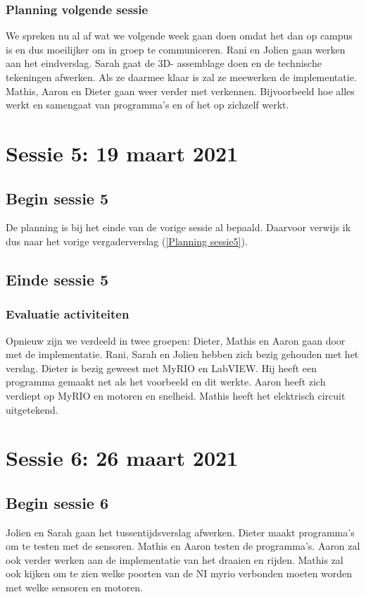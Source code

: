 \documentclass[a4paper,twoside,kulak]{kulakreport} %
\begin{document}
\subsection{Planning volgende sessie}
We spreken nu al af wat we volgende week gaan doen omdat het dan op campus is en dus moeilijker om in groep te communiceren. Rani en Jolien gaan werken aan het eindverslag. Sarah gaat de 3D- assemblage doen en de technische tekeningen afwerken. Als ze daarmee klaar is zal ze meewerken de implementatie. Mathis, Aaron en Dieter gaan weer verder met verkennen. Bijvoorbeeld hoe alles werkt en samengaat van programma's en of het op zichzelf werkt. %
\label{Planning sessie5}

\chapter{Sessie 5: 19 maart 2021}
\section{Begin sessie 5}
De planning is bij het einde van de vorige sessie al bepaald. Daarvoor verwijs ik dus naar het vorige vergaderverslag (\ref{Planning sessie5}).

\section{Einde sessie 5}
\subsection{Evaluatie activiteiten}
Opnieuw zijn we verdeeld in twee groepen: Dieter, Mathis en Aaron gaan door met de implementatie. Rani, Sarah en Jolien hebben zich bezig gehouden met het verslag. Dieter is bezig geweest met MyRIO en LabVIEW. Hij heeft een programma gemaakt net als het voorbeeld en dit werkte. Aaron heeft zich verdiept op MyRIO en motoren en snelheid. Mathis heeft het elektrisch circuit uitgetekend. 

\chapter{Sessie 6: 26 maart 2021}
\section{Begin sessie 6}
Jolien en Sarah gaan het tussentijdsverslag afwerken. Dieter maakt programma's om te testen met de sensoren. Mathis en Aaron testen de programma's. Aaron zal ook verder werken aan de implementatie van het draaien en rijden. Mathis zal ook kijken om te zien welke poorten van de NI myrio verbonden moeten worden met welke sensoren en motoren. 
\end{document}
